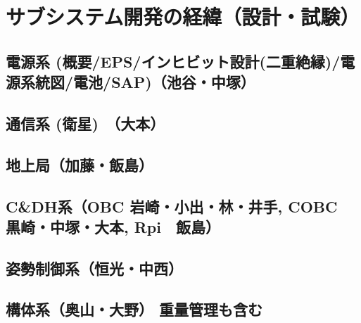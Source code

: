 \chapter{サブシステム開発の経緯（設計・試験）}
\label{chap:subsystem}

%

\section{電源系 (概要/EPS/インヒビット設計(二重絶縁)/電源系統図/電池/SAP)（池谷・中塚）}

\section{通信系 (衛星)　（大本）}

\section{地上局（加藤・飯島）}

\section{C\&DH系（OBC 岩崎・小出・林・井手, COBC　黒崎・中塚・大本, Rpi　飯島）}

\section{姿勢制御系（恒光・中西）}

\section{構体系（奥山・大野） 重量管理も含む}


